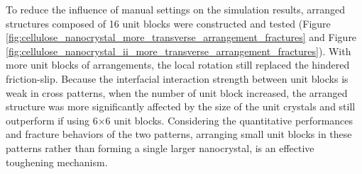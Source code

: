 \documentclass{article}
\begin{document}
To reduce the influence of manual settings on the simulation results, arranged structures composed of 16 unit blocks were constructed and tested (Figure \ref{fig:cellulose_nanocrystal_more_transverse_arrangement_fractures} and Figure \ref{fig:cellulose_nanocrystal_ii_more_transverse_arrangement_fractures}).
With more unit blocks of arrangements, the local rotation still replaced the hindered friction-slip.
Because the interfacial interaction strength between unit blocks is weak in cross patterns, when the number of unit block increased, the arranged structure was more significantly affected by the size of the unit crystals and still outperform if using 6$\times$6 unit blocks.
Considering the quantitative performances and fracture behaviors of the two patterns, arranging small unit blocks in these patterns rather than forming a single larger nanocrystal, is an effective toughening mechanism.
\end{document}
